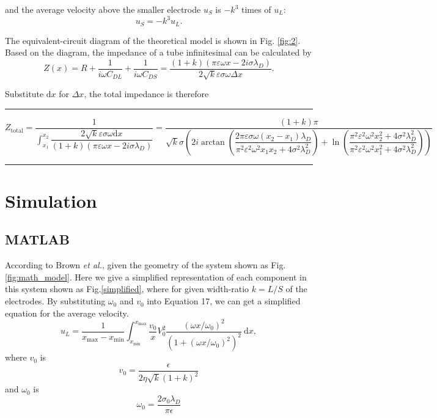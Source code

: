 \documentclass[journal,svgnames,twocolumn,x11names]{IEEEtran}
\begin{document}
and the average velocity above the smaller electrode $u_S$ is $-k^3$ times of $u_L$:
\begin{equation}
    u_S=-k^3u_L.
\end{equation}

The equivalent-circuit diagram of the theoretical model is shown in Fig. \ref{fig:2}.
Based on the diagram, the impedance of a tube infinitesimal can be calculated by
\begin{equation}
    Z(x)=R+\frac{1}{i\omega C_{DL}}+\frac{1}{i\omega C_{DS}}=\frac{(1+k)(\pi\varepsilon\omega x-2i\sigma\lambda_D)}{2\sqrt{k}\varepsilon\sigma\omega\Delta x}.
\end{equation}

Substitute $\mathrm{d}x$ for $\Delta x$, the total impedance is therefore

\begin{strip}
    \rule{0.5\textwidth}{.4pt}
    \begin{equation}
        Z_\text{total}=\frac{1}{\int_{x_1}^{x_2}{\dfrac{2\sqrt{k}\varepsilon\sigma\omega\mathrm{d}x}{(1+k)(\pi\varepsilon\omega x-2i\sigma\lambda_D)}}}=\frac{(1+k)\pi}{\sqrt{k}\sigma\left(2i\arctan{\left(\dfrac{2\pi\varepsilon\sigma\omega (x_2-x_1)\lambda_D}{\pi^2\varepsilon^2\omega^2x_1x_2+4\sigma^2\lambda_D^2}\right)}+\ln{\left(\dfrac{\pi^2\varepsilon^2\omega^2x_2^2+4\sigma^2\lambda_D^2}{\pi^2\varepsilon^2\omega^2x_1^2+4\sigma^2\lambda_D^2}\right)}\right)}
    \end{equation}
    \hspace{0.5\textwidth}\rule{0.5\textwidth}{.4pt}
\end{strip}


\section{Simulation}
\subsection{MATLAB}

\vspace{-0.63cm}
According to Brown \textit{et al.}\cite{Brown2000}, given the geometry of the system shown as Fig.\ref{fig:math_model}. Here we give a simplified representation of each component in this system shown as Fig.\ref{simplified}, where for given width-ratio $k = L/S$ of the electrodes. By substituting $\omega_{0}$ and $v_{0}$ into Equation 17, we can get a simplified equation for the average velocity.
\begin{equation}
    u_{\textit{L}}=\frac{1}{x_{\max }-x_{\min }} \int_{x_{\min }}^{x_{\max }} \frac{v_{0}}{x} V_{0}^{2} \frac{\left(\omega x / \omega_{0}\right)^{2}}{\left(1+\left(\omega x / \omega_{0}\right)^{2}\right)^{2}} \mathrm{~d} x,
\end{equation}
where $v_{0}$ is
\begin{equation}
    v_{0}=\frac{\epsilon}{2 \eta \sqrt{k}(1+k)^{2}}
\end{equation}
and $\omega_{0}$ is
\begin{equation}
    \omega_{0}=\frac{2 \sigma_{0} \lambda_{D}}{\pi \epsilon}
\end{equation}
\end{document}
